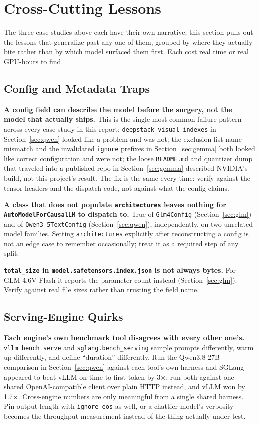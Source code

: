 \documentclass[11pt]{article}
\begin{document}
\section{Cross-Cutting Lessons}
\label{sec:lessons}

The three case studies above each have their own narrative; this section pulls out the
lessons that generalize past any one of them, grouped by where they actually bite rather
than by which model surfaced them first. Each cost real time or real GPU-hours to find.

\subsection{Config and Metadata Traps}

\textbf{A config field can describe the model before the surgery, not the model that
actually ships.} This is the single most common failure pattern across every case study
in this report: \texttt{deepstack\_visual\_indexes} in Section~\ref{sec:qwen} looked
like a problem and was not; the exclusion-list name mismatch and the invalidated
\texttt{ignore} prefixes in Section~\ref{sec:gemma} both looked like correct
configuration and were not; the loose \texttt{README.md} and quantizer dump that
traveled into a published repo in Section~\ref{sec:gemma} described NVIDIA's build, not
this project's result. The fix is the same every time: verify against the tensor
headers and the dispatch code, not against what the config claims.

\textbf{A class that does not populate \texttt{architectures} leaves nothing for
\texttt{AutoModelForCausalLM} to dispatch to.} True of \texttt{Glm4Config}
(Section~\ref{sec:glm}) and of \texttt{Qwen3\_5TextConfig} (Section~\ref{sec:qwen}),
independently, on two unrelated model families. Setting \texttt{architectures}
explicitly after reconstructing a config is not an edge case to remember occasionally;
treat it as a required step of any split.

\textbf{\texttt{total\_size} in \texttt{model.safetensors.index.json} is not always
bytes.} For GLM-4.6V-Flash it reports the parameter count instead (Section~\ref{sec:glm}).
Verify against real file sizes rather than trusting the field name.

\subsection{Serving-Engine Quirks}

\textbf{Each engine's own benchmark tool disagrees with every other one's.}
\texttt{vllm bench serve} and \texttt{sglang.bench\_serving} sample prompts differently,
warm up differently, and define ``duration'' differently. Run the Qwen3.8-27B comparison
in Section~\ref{sec:qwen} against each tool's own harness and SGLang appeared to beat
vLLM on time-to-first-token by 3$\times$; run both against one shared OpenAI-compatible
client over plain HTTP instead, and vLLM won by 1.7$\times$. Cross-engine numbers are
only meaningful from a single shared harness. Pin output length with \texttt{ignore\_eos}
as well, or a chattier model's verbosity becomes the throughput measurement instead of
the thing actually under test.
\end{document}
